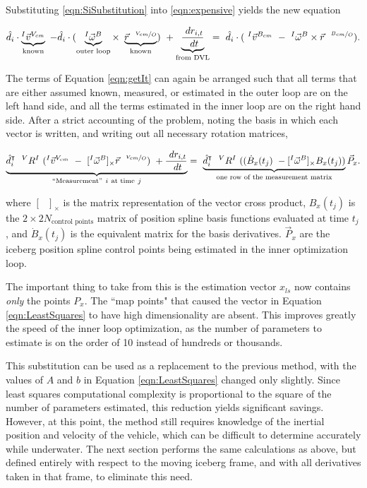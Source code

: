 Substituting \ref{eqn:SiSubstitution} into \ref{eqn:expensive} yields the new equation

     \begin{equation}
 \hat{d}_i\cdot\underbrace{^{I}\vec{v}^{V_{cm}}}_\text{known} ~-
  \hat{d}_i\cdot(\underbrace{^{I}\vec{\omega}^{B}}_{\text{outer loop}}\times~\underbrace{\vec{r}^{~~\nicefrac{V_{cm}}{O}}}_\text{known}) ~+
 \underbrace{ \frac{~dr_{i,t}}{~dt}}_{\text{from DVL}}  
  =~\hat{d}_i\cdot(~^{I}\vec{v}^{B_{cm}} ~-
 ~^{I}\vec{\omega}^{B}\times\vec{r}^{~~\nicefrac{B_{cm}}{O}}).
 \label{eqn:getIt}
\end{equation}

The terms of Equation \ref{eqn:getIt} can again be arranged such that all terms that are either assumed known, measured, or estimated in the outer loop are on the left hand side, and all the terms estimated in the inner loop are on the right hand side. After a strict accounting of the problem, noting the basis in which each vector is written, and writing out all necessary rotation matrices,

\begin{equation}
 \underbrace{\hat{d}_i^{\intercal}~~^{V}R^I ~(^{I}\vec{v}^{V_{cm}} ~-~[^{I}\vec{\omega}^{B}]_\times\vec{r}^{~~\nicefrac{V_{cm}}{O}}) ~+
 \frac{~dr_{i,t}}{~dt} }_{``\text{Measurement}" ~i ~\text{at time}~ j}
  =~\underbrace{\hat{d}_i^{\intercal}~~{^{V}R^I} ~((\dot{B}_x(t_j)~-
 [^{I}\vec{\omega}^{B}]_\times B_x(t_j))}_\text{one row of the measurement matrix}\vec{P}_x.
 \label{eqn:finaldvl}
\end{equation}

where $[~~~]_\times$ is the matrix representation of the vector cross product, $B_x(t_j)$ is the $2\times2N_\text{control points}$ matrix of position spline basis functions evaluated at time $t_j$, and $\dot{B}_x(t_j)$ is the equivalent matrix for the basis derivatives. $\vec{P}_x$ are the iceberg position spline control points being estimated in the inner optimization loop.

The important thing to take from this is the estimation vector $x_{ls}$ now contains \emph{only} the points $P_x$. The ``map points" that caused the vector in Equation \ref{eqn:LeastSquares} to have high dimensionality are absent. This improves greatly the speed of the inner loop optimization, as the number of parameters to estimate is on the order of 10 instead of hundreds or thousands.

This substitution can be used as a replacement to the previous method, with the values of $A$ and $b$ in Equation \ref{eqn:LeastSquares} changed only slightly. Since least squares computational complexity is proportional to the square of the number of parameters estimated, this reduction yields significant savings. However, at this point, the method still requires knowledge of the inertial position and velocity of the vehicle, which can be difficult to determine accurately while underwater. The next section performs the same calculations as above, but defined entirely with respect to the moving iceberg frame, and with all derivatives taken in that frame, to eliminate this need. 

